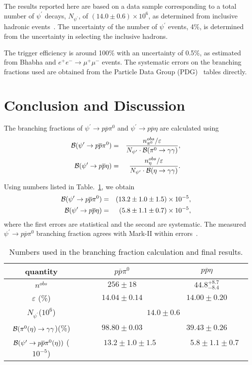 \documentclass[prd,twocolumn,showpacs,amsmath,amssymb]{revtex4}
\newcommand{\BR}{{\cal B}}
\newcommand{\eff}{\varepsilon}
\newcommand{\psip}{\psi^\prime}
\newcommand{\psp}{\psi^\prime}
\newcommand{\piz}{\pi^0}
\newcommand{\ppb}{p\overline{p}}
\newcommand{\ra}{\rightarrow}
\newcommand{\pspto}{\psi^\prime \rightarrow }
\newcommand{\g}{\gamma}
\begin{document}
The results reported here are based on a data sample corresponding
to a total number of $\psip$ decays, $N_{\psp}$, of $(14.0 \pm
0.6) \times 10^6$, as determined from inclusive hadronic
events~\cite{pspscan}.  The uncertainty of the number of $\psip$
events, 4\%, is determined from the uncertainty in selecting the
inclusive hadrons.

The trigger efficiency is around 100\% with an uncertainty of
0.5\%, as estimated from Bhabha and $e^+ e^- \ra \mu^+ \mu^-$
events. The systematic errors on the branching fractions used are
obtained from the Particle Data Group (PDG)~\cite{pdg} tables
directly.

\section{Conclusion and Discussion}

The branching fractions of $\pspto \ppb \piz$ and $\pspto \ppb
\eta$ are calculated using
\begin{eqnarray*}
   \BR(\pspto \ppb \piz)&=&\frac{n^{obs}_{\piz}/\varepsilon}
{N_{\psp}\cdot \BR(\piz \ra \g\g)},\\
   \BR(\pspto \ppb \eta)&=&\frac{n^{obs}_{\eta}/\varepsilon}
{N_{\psp}\cdot \BR(\eta \ra \g\g)}.
\end{eqnarray*}

Using numbers listed in Table.~\ref{br}, we obtain
\begin{eqnarray*}
   \BR(\pspto \ppb \piz)& =& (13.2\pm 1.0\pm 1.5)\times 10^{-5},\\
   \BR(\pspto \ppb \eta)& =& (5.8\pm 1.1\pm 0.7)\times  10^{-5},
\end{eqnarray*}
where the first errors are statistical and the second are
systematic.  The measured $\pspto \ppb \piz$ branching fraction
agrees with Mark-II within errors~\cite{markii}.

\begin{table}[htbp]
\caption{Numbers used in the branching fraction calculation and
final results.}
\begin{center}
\begin{tabular}{c|cc}\hline\hline
quantity & $\ppb\piz$ & $\ppb\eta$\\\hline
$n^{obs}$         & $ 256  \pm 18$  & $44.8^{+8.7}_{-8.4}$\\
$\eff$ (\%)       & $ 14.04\pm0.14$ & $14.00\pm0.20$ \\
$N_{\psip}$($10^6$)   & \multicolumn{2}{c}{$14.0 \pm 0.6$} \\
$\BR(\piz(\eta) \ra \g\g$)(\%) & $98.80\pm0.03$ & $39.43\pm0.26$\\\hline
$\BR(\pspto \ppb\piz(\eta))$ ($10^{-5}$) & ~~~~$13.2\pm 1.0\pm 1.5$~~~~
                                & ~~~~$5.8\pm 1.1\pm 0.7$~~~~  \\\hline
\end{tabular}
\end{center}
\label{br}
\end{table}
\end{document}
